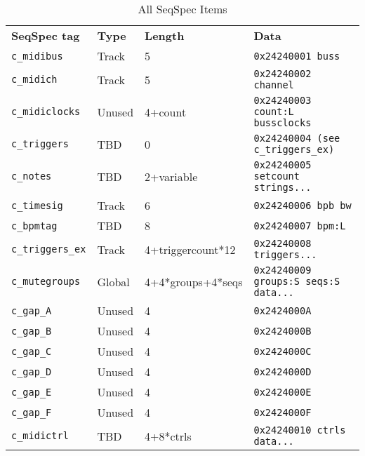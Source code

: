    \begin{table}[htb]
      \centering
      \caption{All SeqSpec Items}
      \label{table:seqspec_items_all}
      \begin{tabular}{l l l l}
         \textbf{SeqSpec tag}        & \textbf{Type} & \textbf{Length}   & \textbf{Data} \\
         \texttt{c\_midibus}         & Track         & 5                 & \texttt{0x24240001 buss} \\
         \texttt{c\_midich}          & Track         & 5                 & \texttt{0x24240002 channel} \\
         \texttt{c\_midiclocks}      & Unused        & 4+count           & \texttt{0x24240003 count:L bussclocks} \\
         \texttt{c\_triggers}        & TBD           & 0                 & \texttt{0x24240004 (see c\_triggers\_ex)} \\
         \texttt{c\_notes}           & TBD           & 2+variable        & \texttt{0x24240005 setcount strings...} \\
         \texttt{c\_timesig}         & Track         & 6                 & \texttt{0x24240006 bpb bw} \\
         \texttt{c\_bpmtag}          & TBD           & 8                 & \texttt{0x24240007 bpm:L } \\
         \texttt{c\_triggers\_ex}    & Track         & 4+triggercount*12 & \texttt{0x24240008 triggers...} \\
         \texttt{c\_mutegroups}      & Global        & 4+4*groups+4*seqs & \texttt{0x24240009 groups:S seqs:S data...} \\
         \texttt{c\_gap\_A}          & Unused        & 4                 & \texttt{0x2424000A} \\
         \texttt{c\_gap\_B}          & Unused        & 4                 & \texttt{0x2424000B} \\
         \texttt{c\_gap\_C}          & Unused        & 4                 & \texttt{0x2424000C} \\
         \texttt{c\_gap\_D}          & Unused        & 4                 & \texttt{0x2424000D} \\
         \texttt{c\_gap\_E}          & Unused        & 4                 & \texttt{0x2424000E} \\
         \texttt{c\_gap\_F}          & Unused        & 4                 & \texttt{0x2424000F} \\
         \texttt{c\_midictrl}        & TBD           & 4+8*ctrls         & \texttt{0x24240010 ctrls data...} \\

\end{tabular}
\end{table}
